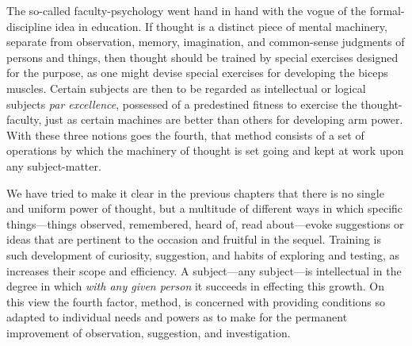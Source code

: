 \documentclass[showtrims,ustradepaper]{memoir}
\begin{document}

The so-called faculty-psychology went hand in hand with the vogue of the
formal-discipline idea in education. If thought is a distinct piece of
mental machinery, separate from observation, memory, imagination, and
common-sense judgments of persons and things, then thought should be
trained by special exercises designed for the purpose, as one might
devise special exercises for developing the biceps muscles. Certain
subjects are then to be regarded as intellectual or logical subjects
\emph{par excellence}, possessed of a predestined fitness to exercise
the thought-faculty, just as certain machines are better than others for
developing arm power. With these three notions goes the fourth, that
method consists of a set of operations by which the machinery of thought
is set going and kept at work upon any subject-matter.


We have tried to make it clear in the previous chapters that there is no
single and uniform power of thought, but a multitude of different ways
in which specific things---things observed, remembered, heard of, read
about---evoke suggestions or ideas that are pertinent to the occasion
and fruitful in the sequel. Training is such development of curiosity,
suggestion, and habits of exploring and testing, as increases their
scope
and efficiency. A subject---any subject---is intellectual in the degree
in which \emph{with any given person} it succeeds in effecting this
growth. On this view the fourth factor, method, is concerned with
providing conditions so adapted to individual needs and powers as to
make for the permanent improvement of observation, suggestion, and
investigation.

\end{document}
